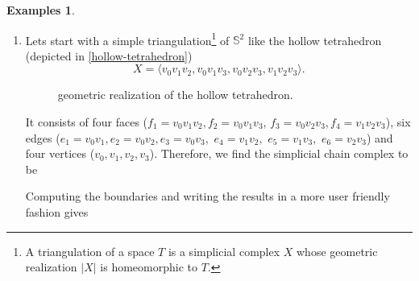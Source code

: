 \documentclass[draft,toc=bib]{scrartcl}
\theoremstyle{plain}
\theoremstyle{definition}
\newtheorem{examples}[theorem]{Examples}
\theoremstyle{remark}
\newcommand{\Z}{\mathbb{Z}}
\newcommand{\Sp}{\mathbb{S}}
\begin{document}
\begin{examples}\mbox{}
	\begin{enumerate}
		\item Lets start with a simple triangulation\footnote{A triangulation of a space $T$ is a simplicial complex $X$ whose geometric realization $|X|$ is homeomorphic to $T$.}
		 of $\Sp^2$ like the hollow tetrahedron (depicted in \autoref{hollow-tetrahedron}) \[X=\langle v_0v_1v_2,v_0v_1v_3,v_0v_2v_3,v_1v_2v_3 \rangle. \]
			 	
		 	\begin{figure}\centering
		 		\caption{geometric realization of the hollow tetrahedron.\label{hollow-tetrahedron}}
		 	\end{figure}
	 It consists of four faces ($f_1=v_0v_1v_2, f_2=v_0v_1v_3$, $f_3=v_0v_2v_3, f_4=v_1v_2v_3$), six edges ($e_1=v_0v_1, e_2=v_0v_2, e_3=v_0v_3,$ $ e_4=v_1v_2, $ $e_5=v_1v_3, $ $e_6=v_2v_3$) and four vertices ($v_0,v_1,v_2,v_3$). Therefore, we find the simplicial chain complex to be
 
 Computing the boundaries and writing the results in a more user friendly fashion gives
 

\end{enumerate}
\end{examples}
\end{document}
